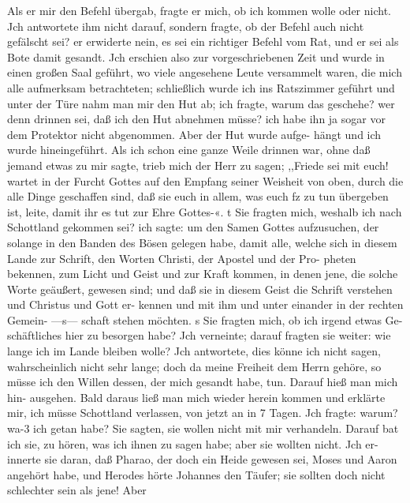 Als er mir den Befehl übergab, fragte er mich, ob ich kommen
wolle oder nicht. Jch antwortete ihm nicht darauf, sondern
fragte, ob der Befehl auch nicht gefälscht sei? er erwiderte nein,
es sei ein richtiger Befehl vom Rat, und er sei als Bote damit
gesandt. Jch erschien also zur vorgeschriebenen Zeit und wurde in
einen großen Saal geführt, wo viele angesehene Leute versammelt
waren, die mich alle aufmerksam betrachteten; schließlich wurde
ich ins Ratszimmer geführt und unter der Türe nahm man mir
den Hut ab; ich fragte, warum das geschehe? wer denn drinnen
sei, daß ich den Hut abnehmen müsse? ich habe ihn ja sogar vor
dem Protektor nicht abgenommen. Aber der Hut wurde aufge-
hängt und ich wurde hineingeführt. Als ich schon eine ganze
Weile drinnen war, ohne daß jemand etwas zu mir sagte, trieb
mich der Herr zu sagen; ,,Friede sei mit euch! wartet in der
Furcht Gottes auf den Empfang seiner Weisheit von oben, durch
die alle Dinge geschaffen sind, daß sie euch in allem, was euch
fz zu tun übergeben ist, leite, damit ihr es tut zur Ehre Gottes-«.
t Sie fragten mich, weshalb ich nach Schottland gekommen sei? ich
sagte: um den Samen Gottes aufzusuchen, der solange in den
Banden des Bösen gelegen habe, damit alle, welche sich in diesem
Lande zur Schrift, den Worten Christi, der Apostel und der Pro-
pheten bekennen, zum Licht und Geist und zur Kraft kommen, in
denen jene, die solche Worte geäußert, gewesen sind; und daß sie
in diesem Geist die Schrift verstehen und Christus und Gott er-
kennen und mit ihm und unter einander in der rechten Gemein-
—s— schaft stehen möchten. s Sie fragten mich, ob ich irgend etwas Ge-
schäftliches hier zu besorgen habe? Jch verneinte; darauf fragten
sie weiter: wie lange ich im Lande bleiben wolle? Jch antwortete,
dies könne ich nicht sagen, wahrscheinlich nicht sehr lange; doch
da meine Freiheit dem Herrn gehöre, so müsse ich den Willen
dessen, der mich gesandt habe, tun. Darauf hieß man mich hin-
ausgehen. Bald daraus ließ man mich wieder herein kommen
und erklärte mir, ich müsse Schottland verlassen, von jetzt an in
7 Tagen. Jch fragte: warum? wa-3 ich getan habe? Sie sagten,
sie wollen nicht mit mir verhandeln. Darauf bat ich sie, zu hören,
was ich ihnen zu sagen habe; aber sie wollten nicht. Jch er-
innerte sie daran, daß Pharao, der doch ein Heide gewesen sei,
Moses und Aaron angehört habe, und Herodes hörte Johannes
den Täufer; sie sollten doch nicht schlechter sein als jene! Aber



